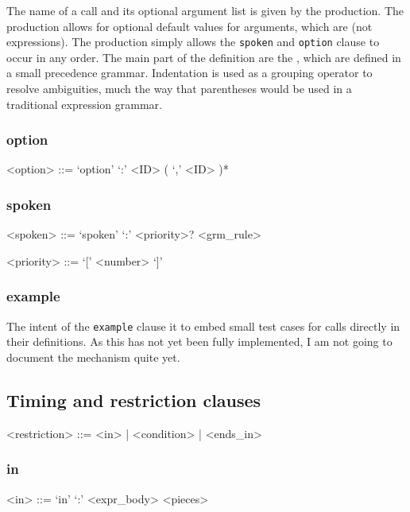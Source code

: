 \documentclass[12pt]{article}
\newcommand{\clause}[1]{\texttt{#1}}
\begin{document}
The name of a call and its optional argument list is given by the
 production.  The 
production allows for optional default values for arguments, which are
 (not expressions).  The 
production simply allows the \clause{spoken} and \clause{option}
clause to occur in any order.  The main part of the definition are the
, which are defined in a small precedence grammar.
Indentation is used as a grouping operator to resolve ambiguities,
much the way that parentheses would be used in a traditional
expression grammar.

\subsubsection{option}
\begin{grammar}
<option> ::= `option' `:' <ID> ( `,' <ID> )*
\end{grammar}

\subsubsection{spoken}
\begin{grammar}
<spoken> ::= `spoken' `:' <priority>? <grm_rule>

<priority> ::= `[' <number> `]'
\end{grammar}

\subsubsection{example}
The intent of the \clause{example} clause it to embed small test cases
for calls directly in their definitions.  As this has not yet been
fully implemented, I am not going to document the mechanism
quite yet.

\subsection{Timing and restriction clauses}
\begin{grammar}
<restriction> ::= <in> | <condition> | <ends_in>
\end{grammar}

\subsubsection{in}\label{sec:in}
\begin{grammar}
<in> ::= `in' `:' <expr_body> <pieces>
\end{grammar}
\end{document}
